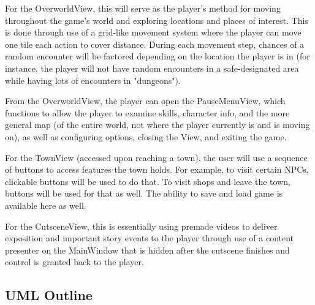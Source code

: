 \documentclass[10pt,conference,onecolumn,compsoc]{IEEEtran}
\begin{document}
For the OverworldView, this will serve as the player's method for moving throughout the game's world and exploring locations and places of interest. This is done through use of a grid-like movement system where the player can move one tile each action to cover distance. During each movement step, chances of a random encounter will be factored depending on the location the player is in (for instance, the player will not have random encounters in a safe-designated area while having lots of encounters in "dungeons").

From the OverworldView, the player can open the PauseMenuView, which functions to allow the player to examine skills, character info, and the more general map (of the entire world, not where the player currently is and is moving on), as well as configuring options, closing the View, and exiting the game.

For the TownView (accessed upon reaching a town), the user will use a sequence of buttons to access features the town holds. For example, to visit certain NPCs, clickable buttons will be used to do that. To visit shops and leave the town, buttons will be used for that as well. The ability to save and load game is available here as well.

For the CutsceneView, this is essentially using premade videos to deliver exposition and important story events to the player through use of a content presenter on the MainWindow that is hidden after the cutscene finishes and control is granted back to the player.


\subsection{UML Outline}

\end{document}
